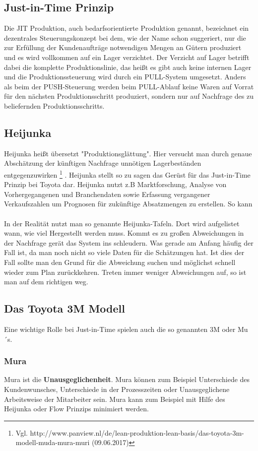 \documentclass[00_ToyotaProduktionssystem.tex]{subfiles}
\begin{document}
\subsection{Just-in-Time Prinzip}
Die JIT Produktion, auch bedarfsorientierte Produktion genannt, bezeichnet ein dezentrales Steuerungskonzept bei dem,  wie der Name schon suggeriert, nur die zur Erfüllung der Kundenaufträge notwendigen Mengen an Gütern produziert und es wird vollkommen auf ein Lager verzichtet. Der Verzicht auf Lager betrifft dabei die komplette Produktionslinie, das heißt es gibt auch keine internen Lager und die Produktionssteuerung wird durch ein PULL-System umgesetzt. Anders als beim der PUSH-Steuerung werden beim PULL-Ablauf keine Waren auf Vorrat für den nächsten Produktionsschritt produziert, sondern nur auf Nachfrage des zu beliefernden Produktionsschritts.

\subsection{Heijunka}
Heijunka heißt übersetzt "Produktionsglättung". Hier versucht man durch genaue Abschätzung der künftigen Nachfrage unnötigen Lagerbeständen entgegenzuwirken
\footnote{Vgl.  http://www.panview.nl/de/lean-produktion-lean-basis/das-toyota-3m-modell-muda-mura-muri (09.06.2017)}
. Heijunka stellt so zu sagen das Gerüst für das Just-in-Time Prinzip bei Toyota dar. Heijunka nutzt z.B Marktforschung, Analyse von Vorhergegangenen und Branchendaten sowie Erfassung vergangener Verkaufszahlen um Prognosen für zukünftige Absatzmengen zu erstellen. So kann 
\\
\\
In der Realität nutzt man so genannte Heijunka-Tafeln. Dort wird aufgelistet wann, wie viel Hergestellt werden muss. Kommt es zu großen Abweichungen in der Nachfrage gerät das System ins schleudern. Was gerade am Anfang häufig der Fall ist, da man noch nicht so viele Daten für die Schätzungen hat. 
Ist dies der Fall sollte man den Grund für die Abweichung suchen und möglichst schnell wieder zum Plan zurückkehren. Treten immer weniger Abweichungen auf, so ist man auf dem richtigen weg.\newpage

\subsection{Das Toyota 3M Modell}
Eine wichtige Rolle bei Just-in-Time spielen auch die so genannten 3M oder Mu´s.
\subsubsection{Mura}
Mura ist die \textbf{Unausgeglichenheit}. Mura können zum Beispiel Unterschiede des Kundenwunsches, Unterschiede in der Prozesszeiten oder Unausgeglichene Arbeitsweise der Mitarbeiter sein. Mura kann zum Beispiel mit Hilfe des Heijunka oder Flow Prinzips minimiert werden. \cite{panview}
\end{document}
